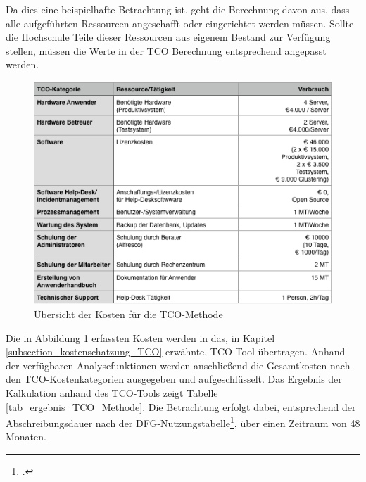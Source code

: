 Da dies eine beispielhafte Betrachtung ist, geht die Berechnung davon aus, dass alle aufgeführten Ressourcen angeschafft oder eingerichtet werden müssen. Sollte die Hochschule Teile dieser Ressourcen aus eigenem Bestand zur Verfügung stellen, müssen die Werte in der TCO Berechnung entsprechend angepasst werden.

\begin{figure}[h]
	\centering
	\includegraphics[width=\textwidth]
	{kapitel/gruppe4_2/bilder/uebersicht_kosten_tco_methode_neu}
	\caption{Übersicht der Kosten für die TCO-Methode}
	\label{tab_ubersicht_kosten_TCO}
\end{figure}

Die in Abbildung \ref{tab_ubersicht_kosten_TCO} erfassten Kosten werden in das, in Kapitel
\ref{subsection_kostenschatzung_TCO} erwähnte, TCO-Tool übertragen. 
Anhand der verfügbaren Analysefunktionen werden anschließend die Gesamtkosten nach den 
TCO-Kostenkategorien ausgegeben und aufgeschlüsselt. Das Ergebnis der Kalkulation anhand 
des TCO-Tools zeigt Tabelle \ref{tab_ergebnis_TCO_Methode}. Die Betrachtung erfolgt dabei, 
entsprechend der Abschreibungsdauer nach der DFG-Nutzungstabelle\footcite[Vgl.]{lmu_dfg_klassen_42}, über einen Zeitraum von 48 Monaten.

